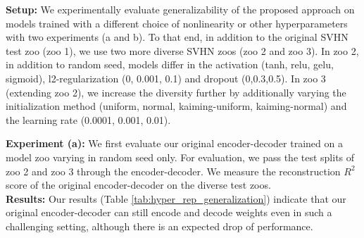 \textbf{Setup:} We experimentally evaluate generalizability of the proposed approach on models trained with a different choice of nonlinearity or other hyperparameters with two experiments (a and b). To that end, in addition to the original SVHN test zoo (zoo 1), we use two more diverse SVHN zoos (zoo 2 and zoo 3). In zoo 2, in addition to random seed, models differ in the activation (tanh, relu, gelu, sigmoid), l2-regularization (0, 0.001, 0.1) and dropout (0,0.3,0.5). In zoo 3 (extending zoo 2), we increase the diversity further by additionally varying the initialization method (uniform, normal, kaiming-uniform, kaiming-normal) and the learning rate (0.0001, 0.001, 0.01).

\textbf{Experiment (a):} We first evaluate our original encoder-decoder trained on a model zoo varying in random seed only. For evaluation, we pass the test splits of zoo 2 and zoo 3 through the encoder-decoder. We measure the reconstruction $R^2$ score of the original encoder-decoder on the diverse test zoos. \\
\textbf{Results:} Our results (Table \ref{tab:hyper_rep_generalization}) indicate that our original encoder-decoder can still encode and decode weights even in such a challenging setting, although there is an expected drop of performance.

